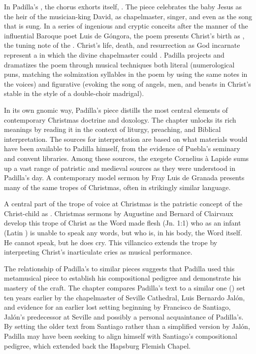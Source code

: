 \documentclass{vcbook-proposal}
\begin{document}
In Padilla's , the chorus exhorts itself, .
The piece celebrates the baby Jesus as the heir of the musician-king David, as chapelmaster, singer, and even as the song that is sung.
In a series of ingenious and cryptic conceits after the manner of the influential Baroque poet Luis de Góngora, the poem presents Christ's birth as , the tuning note of the .
Christ's life, death, and resurrection as God incarnate represent a  in which the divine chapelmaster could .
Padilla projects and dramatizes the poem through musical techniques both literal (numerological puns, matching the solmization syllables in the poem by using the same notes in the voices) and figurative (evoking the song of angels, men, and beasts in Christ's stable in the style of a double-choir madrigal).

In its own gnomic way, Padilla's piece distills the most central elements of contemporary Christmas doctrine and doxology.
The chapter unlocks its rich meanings by reading it in the context of liturgy, preaching, and Biblical interpretation.
The sources for interpretation are based on what materials would have been available to Padilla himself, from the evidence of Puebla's seminary and convent libraries.
Among these sources, the exegete Cornelius à Lapide sums up a vast range of patristic and medieval sources as they were understood in Padilla's day. 
A contemporary model sermon by Fray Luis de Granada presents many of the same tropes of Christmas, often in strikingly similar language.

A central part of the trope of voice at Christmas is the patristic concept of the Christ-child as . 
Christmas sermons by Augustine and Bernard of Clairvaux develop this trope of Christ as the Word made flesh (Jn. 1:1) who as an infant (Latin ) is unable to speak any words, but who is, in his body, the Word itself.
He cannot speak, but he does cry.
This villancico extends the trope by interpreting Christ's inarticulate cries as musical performance.

The relationship of Padilla's  to similar pieces suggests that Padilla used this metamusical piece to establish his compositional pedigree and demonstrate his mastery of the craft.
The chapter compares Padilla's text to a similar one () set ten years earlier by the chapelmaster of Seville Cathedral, Luis Bernardo Jalón, and evidence for an earlier lost setting beginning  by Francisco de Santiago, Jalón's predecessor at Seville and possibly a personal acquaintance of Padilla's.
By setting the older text from Santiago rather than a simplified version by Jalón, Padilla may have been seeking to align himself with Santiago's compositional pedigree, which extended back the Hapsburg Flemish Chapel.
\end{document}
